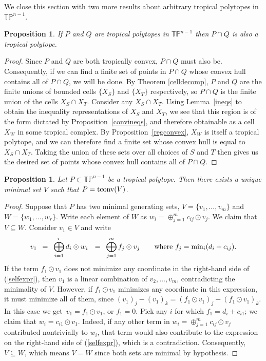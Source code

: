 \documentclass[11pt]{amsart}
\newtheorem{prop}[thm]{Proposition}
\newcommand{\TP}{\mathbb{TP}}
\begin{document}
We close this section with two more results
about arbitrary tropical polytopes in $\TP^{n-1}$.

\begin{prop}\label{intersectpolyt}
If $P$ and $Q$ are tropical polytopes in $\TP^{n-1}$ then
 $P\cap Q$ is also a tropical polytope. 
\end{prop}

\begin{proof}
Since $P$ and $Q$ are both tropically convex, $P\cap Q$ must also be. Consequently, if we can find 
a finite set of points in $P\cap Q$ whose convex hull contains all of $P\cap Q$, we will be done.  By Theorem \ref{celldecomp},
$P$ and $Q$ are the finite unions of
bounded cells  $\{X_S\}$ and $\{X_T\}$ respectively, so $P\cap 
Q$ is the finite union of the cells
$X_S\cap X_T$. 
Consider any $X_S\cap X_T$. Using Lemma~\ref{ineqs} to obtain the inequality representations of 
$X_S$ and $X_T$, we see that this region is of the form dictated by Proposition~\ref{convineqs}, 
and therefore obtainable as a cell $X_W$ in some tropical complex. By Proposition~\ref{regconvex}, 
$X_W$ is itself a tropical polytope, and we can therefore find a finite set whose convex hull is 
equal to $X_S\cap X_T$. Taking the union of these sets over all choices of $S$ and $T$ then gives 
us the desired set of points whose convex hull contains all of $P\cap Q$.
\end{proof}

\begin{prop}\label{vertexunique}
Let $P\subset \TP^{n-1}$ be a tropical polytope. Then there exists a unique minimal set $V$ such that $P={\rm 
tconv}(V)$.
\end{prop}

\begin{proof}
Suppose that $P$ has two minimal generating sets, 
$V=\{v_1,\ldots,v_m\}$ and $W=\{w_1,\ldots,w_r\}$. 
Write each element of $W$ as $w_i = \oplus_{j=1}^m c_{ij}\odot v_j$.
We claim that $V \subseteq W$.
Consider $v_1\in V$ and write
\begin{equation}\label{selfexpr}
v_1 \,\,\,= \,\,\, \bigoplus_{i=1}^r d_i \odot w_i 
\,\, \,\, = \,\,\,\bigoplus_{j=1}^m f_j\odot v_j
\qquad
\hbox{where $f_j = {\rm min}_i (d_i + c_{ij})$}.
\end{equation}
 If the term $f_1\odot v_1$ does not minimize any coordinate in the 
right-hand  side of (\ref{selfexpr}), 
then $v_1$ is a linear combination of $v_2,\ldots,v_m$, 
contradicting the minimality of $V$. 
However, if $f_1\odot v_1$ minimizes any coordinate in this expression, 
it must minimize all of them, since 
$(v_1)_j-(v_1)_k = (f_1\odot v_1)_j - (f_1\odot v_1)_k$. 
In this case we get $\,v_1 
= f_1 \odot v_1$, or $f_1 = 0$. Pick any $i$ 
for which $f_1 = d_i + c_{i1}$; we claim that $w_i = c_{i1} \odot v_1$. 
Indeed, if any other term in $w_i = 
\oplus_{j=1}^m c_{ij}\odot v_j$ contributed nontrivially to $w_i$, 
that term would also contribute  to 
the expression on the right-hand side of (\ref{selfexpr}), 
which is a contradiction.
Consequently, $V\subseteq W$, which means $V=W$ since 
both sets are minimal by hypothesis.
\end{proof}
\end{document}
